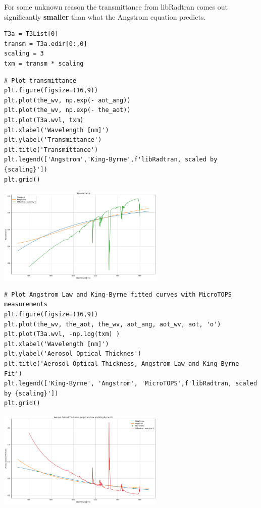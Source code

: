 For some unknown reason the transmittance from libRadtran comes out significantly \textbf{smaller} than what the Angstrom equation predicts.



\begin{lstlisting}[style=tinysize]
T3a = T3List[0]
transm = T3a.edir[0:,0]
scaling = 3
txm = transm * scaling
\end{lstlisting}


\begin{lstlisting}[style=tinysize]
# Plot transmittance
plt.figure(figsize=(16,9))
plt.plot(the_wv, np.exp(- aot_ang))
plt.plot(the_wv, np.exp(- the_aot))
plt.plot(T3a.wvl, txm)
plt.xlabel('Wavelength [nm]')
plt.ylabel('Transmittance')
plt.title('Transmittance')
plt.legend(['Angstrom','King-Byrne',f'libRadtran, scaled by {scaling}'])
plt.grid()

\end{lstlisting}

\begin{center}
\includegraphics[width=0.6\textwidth]{./pic/libraddaskTemplate_22_0.png}
\end{center}


\begin{lstlisting}[style=tinysize]
# Plot Angstrom Law and King-Byrne fitted curves with MicroTOPS measurements
plt.figure(figsize=(16,9))
plt.plot(the_wv, the_aot, the_wv, aot_ang, aot_wv, aot, 'o')
plt.plot(T3a.wvl, -np.log(txm) )
plt.xlabel('Wavelength [nm]')
plt.ylabel('Aerosol Optical Thicknes')
plt.title('Aerosol Optical Thickness, Angstrom Law and King-Byrne Fit')
plt.legend(['King-Byrne', 'Angstrom', 'MicroTOPS',f'libRadtran, scaled by {scaling}'])
plt.grid()

\end{lstlisting}

\begin{center}
\includegraphics[width=0.6\textwidth]{./pic/libraddaskTemplate_23_0.png}
\end{center}


